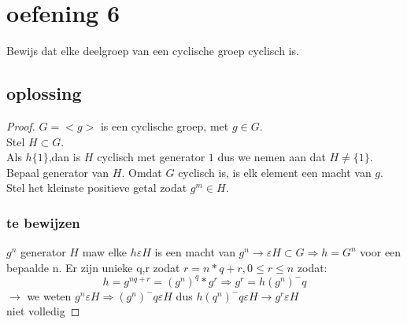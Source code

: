 \documentclass[12pt,a4paper]{article}
\begin{document}
\section*{oefening 6}

Bewijs dat elke deelgroep van een cyclische groep cyclisch is.
\subsection*{oplossing}
\begin{proof}
$G=<g>$ is een cyclische groep, met $g \in G$.
\\Stel $H \subset G$.
\\Als $h\{1\}$,dan is $H$ cyclisch met generator $1$ dus we nemen aan dat $H \neq \{1\}$.
\\Bepaal generator van $H$. Omdat $G$ cyclisch is, is elk element een macht van $g$. 
\\Stel het kleinste positieve getal zodat $g^m \in H$.
\subsubsection*{te bewijzen}
$g^n$ generator $H$ maw elke $h \varepsilon H$ is een macht van $g^n \rightarrow \varepsilon H \subset G \Rightarrow h=G^n$ voor een bepaalde n. Er zijn unieke q,r zodat $r=n*q+r,0\leqslant r \leqslant n$ zodat:
\[
h=g^{nq+r}=(g^n)^q*g^r \Rightarrow g^r=h(g^n)^-q
\]
$\rightarrow$ we weten $g^n \varepsilon H \Rightarrow (g^n)^-q \varepsilon H$ dus $h(q^n)^-q \varepsilon H \rightarrow g^r \varepsilon H$
\\niet volledig

\end{proof}
\end{document}
